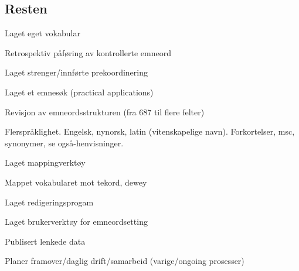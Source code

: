 \subsection{Resten}

Laget eget vokabular

Retrospektiv påføring av kontrollerte emneord

Laget strenger/innførte prekoordinering

Laget et emnesøk (practical applications)

Revisjon av emneordsstrukturen (fra 687 til flere felter)

Flerspråklighet. Engelsk, nynorsk, latin (vitenskapelige navn). Forkortelser, msc, 
synonymer, se også-henvisninger. 

Laget mappingverktøy

Mappet vokabularet mot tekord, dewey

Laget redigeringsprogam 

Laget brukerverktøy for emneordsetting

Publisert lenkede data

Planer framover/daglig drift/samarbeid (varige/ongoing prosesser)
